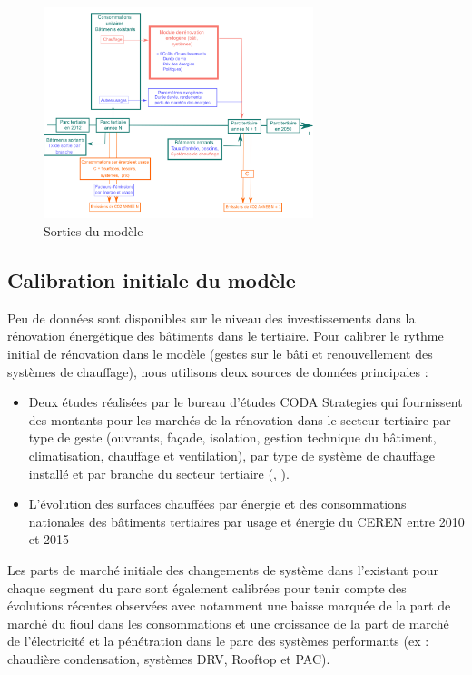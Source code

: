 \documentclass[10.5pt,a4paper]{article}
\begin{document}
{\begin{figure}[h!]
\centering
\caption{Sorties du modèle }\label{schema_final}

\includegraphics[width = 0.7\textwidth]{schema_final}  

\end{figure}

\subsection{Calibration initiale du modèle}

Peu de données sont disponibles sur le niveau des investissements dans la rénovation énergétique des bâtiments dans le tertiaire. Pour calibrer le rythme initial de rénovation dans le modèle (gestes sur le bâti et renouvellement des systèmes de chauffage), nous utilisons deux sources de données principales : 

\begin{itemize}
\item Deux études réalisées par le bureau d'études CODA Strategies qui fournissent des montants pour les marchés de la rénovation dans le secteur tertiaire par type de geste (ouvrants, façade, isolation, gestion technique du bâtiment, climatisation, chauffage et ventilation), par type de système de chauffage installé et par branche du secteur tertiaire (\cite{CODA_2015}, \cite{CODA_2016}).
\item L'évolution des surfaces chauffées par énergie et des consommations nationales des bâtiments tertiaires par usage et énergie du CEREN entre 2010 et 2015
\end{itemize}

Les parts de marché initiale des changements de système dans l’existant pour chaque segment du parc sont également calibrées pour tenir compte des évolutions récentes observées avec notamment une baisse marquée de la part de marché du fioul dans les consommations et une croissance de la part de marché de l’électricité et  la pénétration dans le parc des systèmes performants (ex : chaudière condensation, systèmes DRV, Rooftop et PAC).

}
\end{document}
